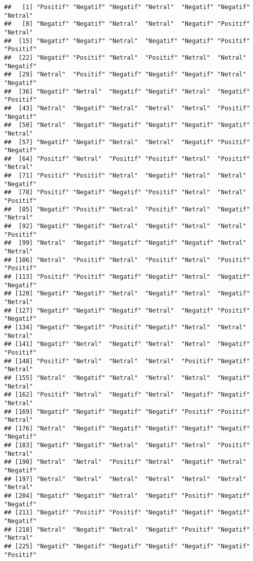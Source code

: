 \documentclass[
]{article}
\begin{document}
\begin{verbatim}
##   [1] "Positif" "Negatif" "Negatif" "Netral"  "Negatif" "Negatif" "Netral" 
##   [8] "Negatif" "Negatif" "Netral"  "Netral"  "Negatif" "Positif" "Netral" 
##  [15] "Negatif" "Negatif" "Netral"  "Negatif" "Negatif" "Positif" "Positif"
##  [22] "Negatif" "Positif" "Netral"  "Positif" "Netral"  "Netral"  "Negatif"
##  [29] "Netral"  "Positif" "Negatif" "Negatif" "Negatif" "Netral"  "Negatif"
##  [36] "Negatif" "Netral"  "Negatif" "Negatif" "Netral"  "Negatif" "Positif"
##  [43] "Netral"  "Negatif" "Netral"  "Netral"  "Netral"  "Positif" "Negatif"
##  [50] "Netral"  "Negatif" "Negatif" "Negatif" "Negatif" "Negatif" "Netral" 
##  [57] "Negatif" "Negatif" "Netral"  "Netral"  "Negatif" "Positif" "Negatif"
##  [64] "Positif" "Netral"  "Positif" "Positif" "Netral"  "Positif" "Netral" 
##  [71] "Positif" "Positif" "Netral"  "Negatif" "Netral"  "Netral"  "Negatif"
##  [78] "Positif" "Negatif" "Negatif" "Positif" "Netral"  "Netral"  "Positif"
##  [85] "Negatif" "Positif" "Netral"  "Positif" "Netral"  "Negatif" "Netral" 
##  [92] "Negatif" "Negatif" "Netral"  "Negatif" "Netral"  "Netral"  "Positif"
##  [99] "Netral"  "Negatif" "Negatif" "Negatif" "Negatif" "Netral"  "Netral" 
## [106] "Netral"  "Positif" "Netral"  "Positif" "Netral"  "Positif" "Positif"
## [113] "Positif" "Positif" "Negatif" "Negatif" "Netral"  "Negatif" "Negatif"
## [120] "Negatif" "Negatif" "Netral"  "Negatif" "Netral"  "Negatif" "Netral" 
## [127] "Negatif" "Negatif" "Negatif" "Netral"  "Negatif" "Positif" "Negatif"
## [134] "Negatif" "Negatif" "Positif" "Negatif" "Netral"  "Netral"  "Netral" 
## [141] "Negatif" "Netral"  "Negatif" "Netral"  "Netral"  "Negatif" "Positif"
## [148] "Positif" "Netral"  "Netral"  "Netral"  "Positif" "Negatif" "Netral" 
## [155] "Netral"  "Negatif" "Netral"  "Netral"  "Netral"  "Negatif" "Netral" 
## [162] "Positif" "Netral"  "Negatif" "Netral"  "Negatif" "Negatif" "Netral" 
## [169] "Negatif" "Negatif" "Negatif" "Negatif" "Positif" "Positif" "Netral" 
## [176] "Netral"  "Negatif" "Negatif" "Negatif" "Negatif" "Negatif" "Negatif"
## [183] "Negatif" "Negatif" "Netral"  "Negatif" "Netral"  "Positif" "Netral" 
## [190] "Netral"  "Netral"  "Positif" "Netral"  "Negatif" "Netral"  "Negatif"
## [197] "Netral"  "Netral"  "Netral"  "Netral"  "Netral"  "Netral"  "Netral" 
## [204] "Negatif" "Negatif" "Netral"  "Negatif" "Positif" "Negatif" "Negatif"
## [211] "Negatif" "Positif" "Positif" "Negatif" "Negatif" "Negatif" "Negatif"
## [218] "Netral"  "Negatif" "Netral"  "Negatif" "Positif" "Negatif" "Netral" 
## [225] "Negatif" "Negatif" "Negatif" "Negatif" "Negatif" "Negatif" "Positif"

\end{verbatim}
\end{document}
